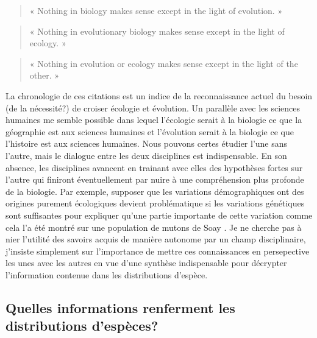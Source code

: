 \begin{quote}
« Nothing in biology makes sense except in the light of evolution. »
\citep{Dobzhansky1973}
\end{quote}

\begin{quote}
« Nothing in evolutionary biology makes sense except in the light of
ecology. » \citep{grant2008}
\end{quote}

\begin{quote}
« Nothing in evolution or ecology makes sense except in the light of the
other. » \citep{Pelletier2009a}
\end{quote}

La chronologie de ces citations est un indice de la reconnaissance
actuel du besoin (de la nécessité?) de croiser écologie et évolution. Un
parallèle avec les sciences humaines me semble possible dans lequel
l'écologie serait à la biologie ce que la géographie est aux sciences
humaines et l'évolution serait à la biologie ce que l'histoire est aux
sciences humaines. Nous pouvons certes étudier l'une sans l'autre, mais
le dialogue entre les deux disciplines est indispensable. En son
absence, les disciplines avancent en trainant avec elles des hypothèses
fortes sur l'autre qui finiront éventuellement par nuire à une
compréhension plus profonde de la biologie. Par exemple, supposer que
les variations démographiques ont des origines purement écologiques
devient problématique si les variations génétiques sont suffisantes pour
expliquer qu'une partie importante de cette variation comme cela l'a été
montré sur une population de mutons de Soay \citep{Pelletier2007}. Je ne
cherche pas à nier l'utilité des savoirs acquis de manière autonome par
un champ disciplinaire, j'insiste simplement sur l'importance de mettre
ces connaissances en persepective les unes avec les autres en vue d'une
synthèse indispensable pour décrypter l'information contenue dans les
distributions d'espèce.

\subsection*{Quelles informations renferment les distributions
d'espèces?}\label{quelles-informations-renferment-les-distributions-despuxe8ces}

